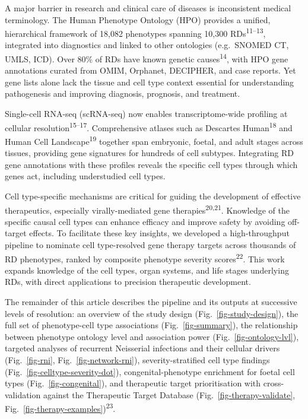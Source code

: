 \documentclass[
]{article}
\begin{document}
A major barrier in research and clinical care of diseases is
inconsistent medical terminology. The Human Phenotype Ontology (HPO)
provides a unified, hierarchical framework of 18,082 phenotypes spanning
10,300 RDs\textsuperscript{11--13}, integrated into diagnostics and
linked to other ontologies (e.g.~SNOMED CT, UMLS, ICD). Over 80\% of RDs
have known genetic causes\textsuperscript{14}, with HPO gene annotations
curated from OMIM, Orphanet, DECIPHER, and case reports. Yet gene lists
alone lack the tissue and cell type context essential for understanding
pathogenesis and improving diagnosis, prognosis, and treatment.

Single-cell RNA-seq (scRNA-seq) now enables transcriptome-wide profiling
at cellular resolution\textsuperscript{15--17}. Comprehensive atlases
such as Descartes Human\textsuperscript{18} and Human Cell
Landscape\textsuperscript{19} together span embryonic, foetal, and adult
stages across tissues, providing gene signatures for hundreds of cell
subtypes. Integrating RD gene annotations with these profiles reveals
the specific cell types through which genes act, including understudied
cell types.

Cell type-specific mechanisms are critical for guiding the development
of effective therapeutics, especially virally-mediated gene
therapies\textsuperscript{20,21}. Knowledge of the specific causal cell
types can enhance efficacy and improve safety by avoiding off-target
effects. To facilitate these key insights, we developed a
high-throughput pipeline to nominate cell type-resolved gene therapy
targets across thousands of RD phenotypes, ranked by composite phenotype
severity scores\textsuperscript{22}. This work expands knowledge of the
cell types, organ systems, and life stages underlying RDs, with direct
applications to precision therapeutic development.

The remainder of this article describes the pipeline and its outputs at
successive levels of resolution: an overview of the study design
(Fig.~\ref{fig-study-design}), the full set of phenotype-cell type
associations (Fig.~\ref{fig-summary}), the relationship between
phenotype ontology level and association power
(Fig.~\ref{fig-ontology-lvl}), targeted analyses of recurrent Neisserial
infections and their cellular drivers (Fig.~\ref{fig-rni},
Fig.~\ref{fig-network-rni}), severity-stratified cell type findings
(Fig.~\ref{fig-celltype-severity-dot}), congenital-phenotype enrichment
for foetal cell types (Fig.~\ref{fig-congenital}), and therapeutic
target prioritisation with cross-validation against the Therapeutic
Target Database (Fig.~\ref{fig-therapy-validate},
Fig.~\ref{fig-therapy-examples})\textsuperscript{23}.
\end{document}
